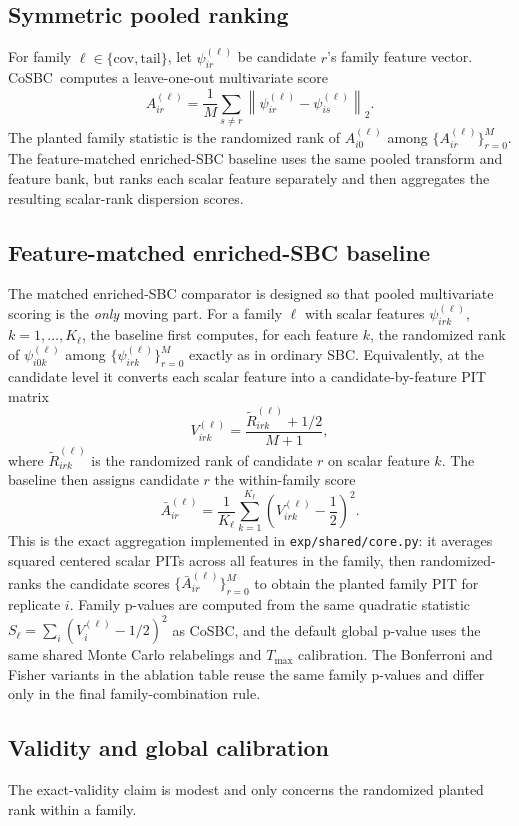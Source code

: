 \documentclass[10pt,twocolumn]{article}
\newcommand{\method}{CoSBC}
\newcommand{\M}{M}
\newcommand{\1}{\mathbf{1}}
\begin{document}
\subsection{Symmetric pooled ranking}
For family $\ell \in \{\mathrm{cov}, \mathrm{tail}\}$, let $\psi_{ir}^{(\ell)}$ be candidate $r$'s family feature vector. \method\ computes a leave-one-out multivariate score
\[
A_{ir}^{(\ell)} =
\frac{1}{\M}
\sum_{s \neq r}
\left\|
\psi_{ir}^{(\ell)} - \psi_{is}^{(\ell)}
\right\|_2.
\]
The planted family statistic is the randomized rank of $A_{i0}^{(\ell)}$ among $\{A_{ir}^{(\ell)}\}_{r=0}^{\M}$. The feature-matched enriched-SBC baseline uses the same pooled transform and feature bank, but ranks each scalar feature separately and then aggregates the resulting scalar-rank dispersion scores.

\subsection{Feature-matched enriched-SBC baseline}
The matched enriched-SBC comparator is designed so that pooled multivariate scoring is the \emph{only} moving part. For a family $\ell$ with scalar features $\psi_{irk}^{(\ell)}$, $k=1,\dots,K_\ell$, the baseline first computes, for each feature $k$, the randomized rank of $\psi_{i0k}^{(\ell)}$ among $\{\psi_{irk}^{(\ell)}\}_{r=0}^{\M}$ exactly as in ordinary SBC. Equivalently, at the candidate level it converts each scalar feature into a candidate-by-feature PIT matrix
\[
V_{irk}^{(\ell)} = \frac{\widetilde R_{irk}^{(\ell)} + 1/2}{\M+1},
\]
where $\widetilde R_{irk}^{(\ell)}$ is the randomized rank of candidate $r$ on scalar feature $k$. The baseline then assigns candidate $r$ the within-family score
\[
\bar A_{ir}^{(\ell)} = \frac{1}{K_\ell}\sum_{k=1}^{K_\ell}\left(V_{irk}^{(\ell)}-\frac{1}{2}\right)^2.
\]
This is the exact aggregation implemented in \texttt{exp/shared/core.py}: it averages squared centered scalar PITs across all features in the family, then randomized-ranks the candidate scores $\{\bar A_{ir}^{(\ell)}\}_{r=0}^{\M}$ to obtain the planted family PIT for replicate $i$. Family p-values are computed from the same quadratic statistic $S_\ell=\sum_i(V_i^{(\ell)}-1/2)^2$ as \method, and the default global p-value uses the same shared Monte Carlo relabelings and $T_{\max}$ calibration. The Bonferroni and Fisher variants in the ablation table reuse the same family p-values and differ only in the final family-combination rule.

\subsection{Validity and global calibration}
The exact-validity claim is modest and only concerns the randomized planted rank within a family.
\end{document}
